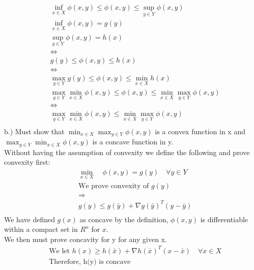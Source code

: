 \documentclass[12pt]{article}
\begin{document}
        \begin{align*}
            &\inf_{x \in X}\phi(x,y) \leq \phi(x,y) \leq \sup_{y \in Y} \phi (x,y)\\
            &\inf_{x \in X} \phi(x,y) = g(y)\\
            &\sup_{y \in Y}\phi(x,y) = h(x)\\
            &\Longleftrightarrow\\
            &g(y) \leq \phi(x,y) \leq h(x)\\
            &\Longleftrightarrow\\
            &\max_{y \in Y} g(y) \leq \phi (x,y) \leq \min_{x \in X} h(x)\\
            &\max_{y \in Y} \min_{x \in X} \phi(x,y) \leq \phi(x,y) \leq \min_{x \in X} \max_{y \in Y} \phi(x,y)\\
            &\Longleftrightarrow\\
            &\max_{y \in Y} \min_{x \in X} \phi(x,y) \leq \min_{x \in X} \max_{y \in Y} \phi(x,y)\\
        \end{align*}
    b.) Must show that $\min_{x \in X} \max_{y \in Y} \phi(x,y)$ is a convex function in x and $\max_{y \in Y} \min_{x \in X} \phi(x,y)$ is a concave function in y.\\
     Without having the assumption of convexity we define the following and prove convexity first:\\
        \begin{align*}
            &\min_{x \in X} \quad \phi(x,y) = g(y) \quad \forall y \in Y\\
            &\text{We prove convexity of }g(y)\\
            &\Longrightarrow\\
            &g(y) \leq g(\bar y) + \nabla g(\bar y)^T (y- \bar y)\\
        \end{align*}
    We have defined $g(x)$ as concave by the definition, $\phi (x,y)$ is differentiable within a compact set in $R^n$ for $x$. \\
    We then must prove concavity for y for any given x.\\
        \begin{align*}
            &\text{We let }h(x) \geq h(\bar x) + \nabla h(\bar x)^T (x - \bar x) \quad \forall x \in X\\
            &\text{Therefore, h(y) is concave}\\
        \end{align*}
\end{document}
